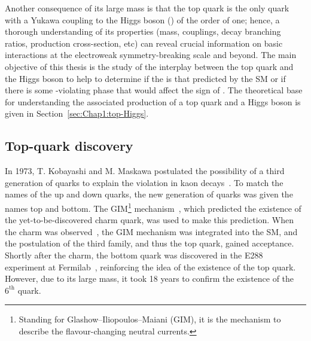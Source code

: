 Another consequence of its large mass is that  the top quark is the only quark with a Yukawa 
coupling to the Higgs boson (\yt) of the order of one; hence, a thorough understanding of its 
properties (mass, couplings, decay branching ratios, production cross-section, etc) can reveal
crucial information on basic interactions at the electroweak symmetry-breaking 
scale and beyond. The main objective of this thesis is the study of the interplay between the top quark and the Higgs boson 
to help to determine if the \yt is that predicted by the SM or if there is some \CP-violating
phase that would affect the sign of \yt. The theoretical base for understanding
the associated production of a top quark and a Higgs boson is given in Section~\ref{sec:Chap1:top-Higgs}. %




\subsection{Top-quark discovery}
In 1973, T. Kobayashi and M. Maskawa postulated the possibility of a third generation of quarks to explain the \CP
violation in kaon decays~\cite{Kobayashi:1973fv}. To match the names of the up and down quarks, the new
generation of quarks was given the names top and bottom.
The GIM\footnote{Standing for Glashow–Iliopoulos–Maiani (GIM), it is the mechanism to describe the flavour-changing neutral currents. }
 mechanism~\cite{Glashow:1970gm}, which predicted the existence of the yet-to-be-discovered charm quark, was used to 
make this prediction.
When the charm was observed~\cite{SLAC-SP-017:1974ind}, the GIM mechanism was integrated into the SM,
and the postulation of the third family, and thus the top quark, gained acceptance. 
Shortly after the charm, the bottom quark was discovered in the E288 experiment 
at Fermilab~\cite{Herb:1977ek}, reinforcing the idea of the existence of the top quark.
However, due to its large mass, it took 18 years to confirm the existence of the $6^{\text{th}}$ quark.


